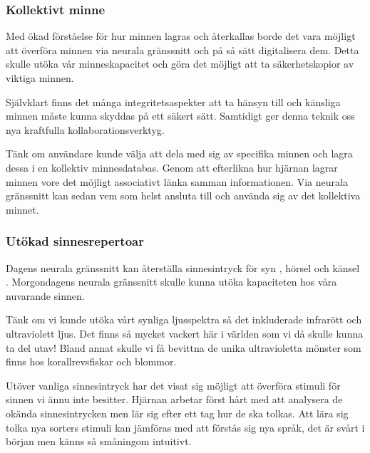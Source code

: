 \documentclass[12pt, a4paper]{article}
\begin{document}
%
%

\subsubsection{Kollektivt minne}

Med ökad förståelse för hur minnen lagras och återkallas borde det vara möjligt
att överföra minnen via neurala gränssnitt och på så sätt digitalisera dem.
Detta skulle utöka vår minneskapacitet och göra det möjligt att ta
säkerhetskopior av viktiga minnen.

Självklart finns det många integritetsaspekter att ta hänsyn till och känsliga
minnen måste kunna skyddas på ett säkert sätt. Samtidigt ger denna teknik oss
nya kraftfulla kollaborationsverktyg.

Tänk om användare kunde välja att dela med sig av specifika minnen och lagra
dessa i en kollektiv minnesdatabas. Genom att efterlikna hur hjärnan lagrar
minnen vore det möjligt associativt länka samman informationen. Via neurala
gränssnitt kan sedan vem som helst ansluta till och använda sig av det
kollektiva minnet.


\subsubsection{Utökad sinnesrepertoar}

Dagens neurala gränssnitt kan återställa sinnesintryck för syn \cite{sight1},
hörsel \cite{sound} och känsel \cite{touch}. Morgondagens neurala gränssnitt
skulle kunna utöka kapaciteten hos våra nuvarande sinnen.

Tänk om vi kunde utöka vårt synliga ljusspektra så det inkluderade infrarött och
ultraviolett ljus. Det finns så mycket vackert här i världen som vi då skulle
kunna ta del utav! Bland annat skulle vi få bevittna de unika ultravioletta
mönster som finns hos korallrevsfiskar \cite{uv_patterns} och blommor.

Utöver vanliga sinnesintryck har det visat sig möjligt att överföra stimuli för
sinnen vi ännu inte besitter. Hjärnan arbetar först hårt med att analysera de
okända sinnesintrycken men lär sig efter ett tag hur de ska tolkas. Att lära sig
tolka nya sorters stimuli kan jämföras med att förstås sig nya språk, det är
svårt i början men känns så småningom intuitivt. \cite{learn_sense}
\end{document}
